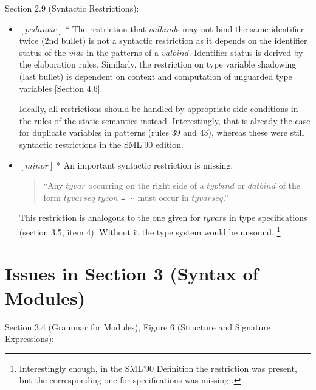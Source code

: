 \documentclass{article}
\newcommand{\m}[1]{$[\mathit{#1}]\;$}
\newcommand{\minor}{\m{minor}}
\newcommand{\pedantic}{\m{pedantic}}
\begin{document}
Section 2.9 (Syntactic Restrictions):
\nopagebreak

\begin{itemize}
\item \pedantic * The restriction that $\mathit{valbind}$s may not bind the same identifier twice (2nd bullet) is not a syntactic restriction as it depends on the identifier status of the $\mathit{vid}$s in the patterns of a $\mathit{valbind}$. Identifier status is derived by the elaboration rules. Similarly, the restriction on type variable shadowing (last bullet) is dependent on context and computation of unguarded type variables [Section 4.6].

Ideally, all restrictions should be handled by appropriate side conditions in the rules of the static semantics instead. Interestingly, that is already the case for duplicate variables in patterns (rules 39 and 43), whereas these were still syntactic restrictions in the SML'90 edition.

\item \minor * An important syntactic restriction is missing:

\begin{quote}
``Any $\mathit{tyvar}$ occurring on the right side of a $\mathit{typbind}$ or $\mathit{datbind}$ of the form $\mathit{tyvarseq}$ $\mathit{tycon}$ {\tt =} $\cdots$ must occur in $\mathit{tyvarseq}$.''
\end{quote}

This restriction is analogous to the one given for $\mathit{tyvar}$s in type specifications (section 3.5, item 4). Without it the type system would be unsound. \footnote{Interestingly enough, in the SML'90 Definition the restriction was present, but the corresponding one for specifications was missing \cite{commentary}.}
\end{itemize}


\section{Issues in Section 3 (Syntax of Modules)}
\label{bugschapter3}

Section 3.4 (Grammar for Modules), Figure 6 (Structure and Signature Expressions):
\nopagebreak
\end{document}
